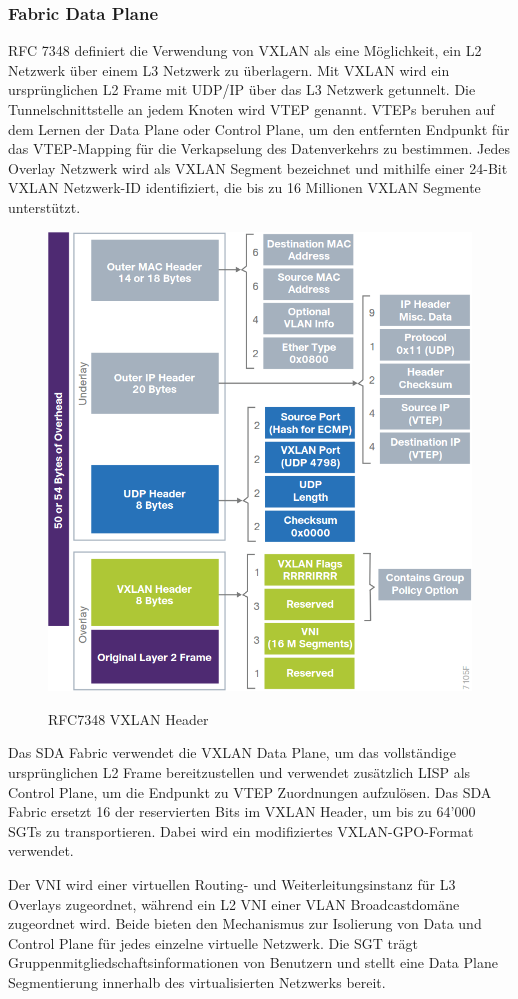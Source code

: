 \subsubsection{Fabric Data Plane}
RFC 7348 definiert die Verwendung von VXLAN als eine Möglichkeit, ein L2 Netzwerk über einem L3 Netzwerk zu überlagern. Mit VXLAN wird ein ursprünglichen L2 Frame mit UDP/IP über das L3 Netzwerk getunnelt. Die Tunnelschnittstelle an jedem Knoten wird VTEP genannt. VTEPs beruhen auf dem Lernen der Data Plane oder Control Plane, um den entfernten Endpunkt für das VTEP-Mapping für die Verkapselung des Datenverkehrs zu bestimmen. Jedes Overlay Netzwerk wird als VXLAN Segment bezeichnet und mithilfe einer 24-Bit VXLAN Netzwerk-ID identifiziert, die bis zu 16 Millionen VXLAN Segmente unterstützt. \cite{rfc-7348}

\begin{figure}[H]
	\centering
	\includegraphics[width=0.7\linewidth]{img/RFC7348-VXLAN-Header.png}\\[1px]
	\caption{RFC7348 VXLAN Header \cite{sda-designguide}}
	\label{fig:RFC7348 VXLAN Header}
\end{figure}

Das SDA Fabric verwendet die VXLAN Data Plane, um das vollständige ursprünglichen L2 Frame bereitzustellen und verwendet zusätzlich LISP als Control Plane, um die Endpunkt zu VTEP Zuordnungen aufzulösen. Das SDA Fabric ersetzt 16 der reservierten Bits im VXLAN Header, um bis zu 64'000 SGTs zu transportieren. Dabei wird ein modifiziertes VXLAN-GPO-Format verwendet.

Der VNI wird einer virtuellen Routing- und Weiterleitungsinstanz für L3 Overlays zugeordnet, während ein L2 VNI einer VLAN Broadcastdomäne zugeordnet wird. Beide bieten den Mechanismus zur Isolierung von Data und Control Plane für jedes einzelne virtuelle Netzwerk. Die SGT trägt Gruppenmitgliedschaftsinformationen von Benutzern und stellt eine Data Plane Segmentierung innerhalb des virtualisierten Netzwerks bereit. \cite{sda-designguide}

